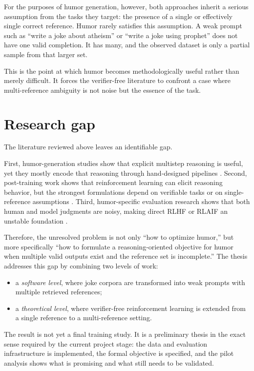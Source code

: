 \documentclass[14pt,a4paper]{extreport}
\begin{document}
For the purposes of humor generation, however, both approaches inherit a serious assumption from the tasks they target: the presence of a single or effectively single correct reference. Humor rarely satisfies this assumption. A weak prompt such as ``write a joke about atheism'' or ``write a joke using prophet'' does not have one valid completion. It has many, and the observed dataset is only a partial sample from that larger set.

This is the point at which humor becomes methodologically useful rather than merely difficult. It forces the verifier-free literature to confront a case where multi-reference ambiguity is not noise but the essence of the task.

\section{Research gap}

The literature reviewed above leaves an identifiable gap.

First, humor-generation studies show that explicit multistep reasoning is useful, yet they mostly encode that reasoning through hand-designed pipelines \citep{Tikhonov2024,ZhangJ2025,Kim2025}. Second, post-training work shows that reinforcement learning can elicit reasoning behavior, but the strongest formulations depend on verifiable tasks or on single-reference assumptions \citep{DeepSeek2025,Zhou2025,Yu2025}. Third, humor-specific evaluation research shows that both human and model judgments are noisy, making direct RLHF or RLAIF an unstable foundation \citep{Zhang2024HumorAI,Sakabe2025}.

Therefore, the unresolved problem is not only ``how to optimize humor,'' but more specifically ``how to formulate a reasoning-oriented objective for humor when multiple valid outputs exist and the reference set is incomplete.'' The thesis addresses this gap by combining two levels of work:
\begin{itemize}
  \item a \emph{software level}, where joke corpora are transformed into weak prompts with multiple retrieved references;
  \item a \emph{theoretical level}, where verifier-free reinforcement learning is extended from a single reference to a multi-reference setting.
\end{itemize}

The result is not yet a final training study. It is a preliminary thesis in the exact sense required by the current project stage: the data and evaluation infrastructure is implemented, the formal objective is specified, and the pilot analysis shows what is promising and what still needs to be validated.
\end{document}
